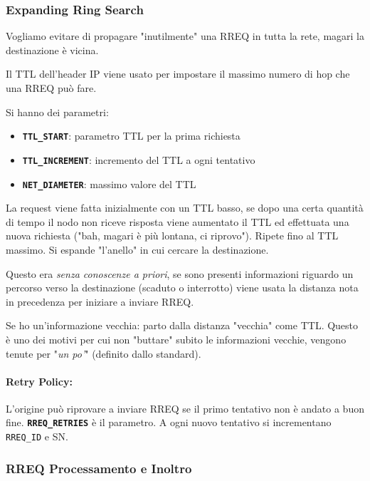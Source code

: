 \subsubsection{Expanding Ring Search}

 Vogliamo evitare di propagare "inutilmente" una RREQ in tutta la rete, magari la destinazione è vicina. 
 
 Il TTL dell'header IP viene usato per impostare il massimo numero di hop che una RREQ può fare.

Si hanno dei parametri:
\begin{itemize}
	\item \textbf{\texttt{TTL\_START}}: parametro TTL per la prima richiesta

	\item \textbf{\texttt{TTL\_INCREMENT}}: incremento del TTL a ogni tentativo

	\item \texttt{\textbf{NET\_DIAMETER}}: massimo valore del TTL
\end{itemize}

La request viene fatta inizialmente con un TTL basso, se dopo una certa quantità di tempo il nodo non riceve risposta viene aumentato il TTL ed effettuata una nuova richiesta ("bah, magari è più lontana, ci riprovo"). Ripete fino al TTL massimo. Si espande "l'anello" in cui cercare la destinazione.

Questo era \textit{senza conoscenze a priori}, se sono presenti informazioni riguardo un percorso verso la destinazione (scaduto o interrotto) viene usata la distanza nota in precedenza per iniziare a inviare RREQ. 

Se ho un'informazione vecchia: parto dalla distanza "vecchia" come TTL. Questo è uno dei motivi per cui non "buttare" subito le informazioni vecchie, vengono tenute per "\textit{un po'}" (definito dallo standard).

\paragraph{Retry Policy:} L'origine può riprovare a inviare RREQ se il primo tentativo non è andato a buon fine. \texttt{\textbf{RREQ\_RETRIES}} è il parametro. A ogni nuovo tentativo si incrementano \texttt{RREQ\_ID} e SN.

\subsubsection{RREQ Processamento e Inoltro}

